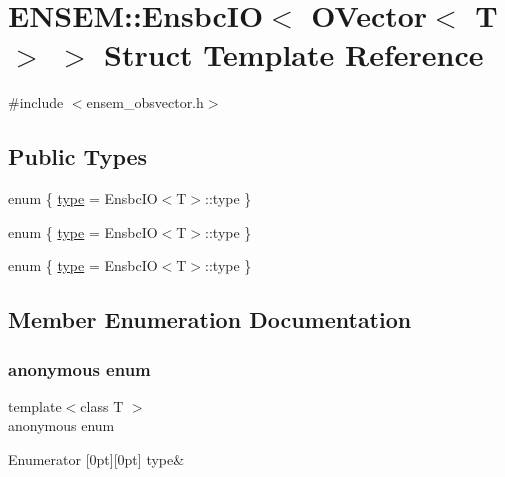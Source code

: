 \hypertarget{structENSEM_1_1EnsbcIO_3_01OVector_3_01T_01_4_01_4}{}\section{E\+N\+S\+EM\+:\+:Ensbc\+IO$<$ O\+Vector$<$ T $>$ $>$ Struct Template Reference}
\label{structENSEM_1_1EnsbcIO_3_01OVector_3_01T_01_4_01_4}


{\ttfamily \#include $<$ensem\+\_\+obsvector.\+h$>$}

\subsection*{Public Types}
\begin{DoxyCompactItemize}
\item 
enum \{ \mbox{\hyperlink{structENSEM_1_1EnsbcIO_3_01OVector_3_01T_01_4_01_4_aec51a8b8d57f021bc8e72faea03f84f5a5ec4910ef487633a25ec3ae40769fa45}{type}} = Ensbc\+IO$<$T$>$\+:\+:type
 \}
\item 
enum \{ \mbox{\hyperlink{structENSEM_1_1EnsbcIO_3_01OVector_3_01T_01_4_01_4_aec51a8b8d57f021bc8e72faea03f84f5a5ec4910ef487633a25ec3ae40769fa45}{type}} = Ensbc\+IO$<$T$>$\+:\+:type
 \}
\item 
enum \{ \mbox{\hyperlink{structENSEM_1_1EnsbcIO_3_01OVector_3_01T_01_4_01_4_aec51a8b8d57f021bc8e72faea03f84f5a5ec4910ef487633a25ec3ae40769fa45}{type}} = Ensbc\+IO$<$T$>$\+:\+:type
 \}
\end{DoxyCompactItemize}


\subsection{Member Enumeration Documentation}
\mbox{\label{structENSEM_1_1EnsbcIO_3_01OVector_3_01T_01_4_01_4_af687d4373c13ed8655d840312331adc3}} 
\subsubsection{\texorpdfstring{anonymous enum}{anonymous enum}}
{\footnotesize\ttfamily template$<$class T $>$ \\
anonymous enum}

\begin{DoxyEnumFields}{Enumerator}
[0pt][0pt]{}\mbox{\label{structENSEM_1_1EnsbcIO_3_01OVector_3_01T_01_4_01_4_aec51a8b8d57f021bc8e72faea03f84f5a5ec4910ef487633a25ec3ae40769fa45}} 
type&\\
\hline

\end{DoxyEnumFields}
\mbox{\label{structENSEM_1_1EnsbcIO_3_01OVector_3_01T_01_4_01_4_a50a831e2b3394254e373ae71b6941de1}} 
